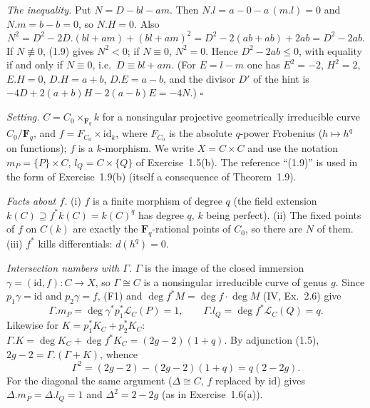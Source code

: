 \documentclass[11pt]{article}
\begin{document}
\emph{The inequality.} Put $N=D-bl-am$. Then $N.l=a-0-a\,(m.l)=0$ and $N.m=b-b=0$, so $N.H=0$. Also
\[ N^2=D^2-2D.(bl+am)+(bl+am)^2=D^2-2(ab+ab)+2ab=D^2-2ab. \]
If $N\not\equiv0$, (1.9) gives $N^2<0$; if $N\equiv0$, $N^2=0$. Hence $D^2-2ab\le0$, with equality if and only if $N\equiv0$, i.e.\ $D\equiv bl+am$. (For $E=l-m$ one has $E^2=-2$, $H^2=2$, $E.H=0$, $D.H=a+b$, $D.E=a-b$, and the divisor $D'$ of the hint is $-4D+2(a+b)H-2(a-b)E=-4N$.) \hfill$\square$

\pf
\emph{Setting.} $C=C_0\times_{\mathbf F_q}k$ for a nonsingular projective geometrically irreducible curve $C_0/\mathbf F_q$, and $f=F_{C_0}\times\mathrm{id}_k$, where $F_{C_0}$ is the absolute $q$-power Frobenius ($h\mapsto h^q$ on functions); $f$ is a $k$-morphism. We write $X=C\times C$ and use the notation $m_P=\{P\}\times C$, $l_Q=C\times\{Q\}$ of Exercise~1.5(b). The reference ``(1.9)'' is used in the form of Exercise~1.9(b) (itself a consequence of Theorem~1.9).

\emph{Facts about $f$.} (i) $f$ is a finite morphism of degree $q$ (the field extension $k(C)\supseteq f^*k(C)=k(C)^q$ has degree $q$, $k$ being perfect). (ii) The fixed points of $f$ on $C(k)$ are exactly the $\mathbf F_q$-rational points of $C_0$, so there are $N$ of them. (iii) $f^*$ kills differentials: $d(h^q)=0$.

\emph{Intersection numbers with $\Gamma$.} $\Gamma$ is the image of the closed immersion $\gamma=(\mathrm{id},f):C\to X$, so $\Gamma\cong C$ is a nonsingular irreducible curve of genus $g$. Since $p_1\gamma=\mathrm{id}$ and $p_2\gamma=f$, (F1) and $\deg f^*M=\deg f\cdot\deg M$ (IV, Ex.~2.6) give
\[ \Gamma.m_P=\deg\gamma^*p_1^*\mathcal L_C(P)=1,\qquad \Gamma.l_Q=\deg f^*\mathcal L_C(Q)=q. \]
Likewise for $K=p_1^*K_C+p_2^*K_C$: $\Gamma.K=\deg K_C+\deg f^*K_C=(2g-2)(1+q)$. By adjunction (1.5), $2g-2=\Gamma.(\Gamma+K)$, whence
\[ \Gamma^2=(2g-2)-(2g-2)(1+q)=q(2-2g). \]
For the diagonal the same argument ($\Delta\cong C$, $f$ replaced by $\mathrm{id}$) gives $\Delta.m_P=\Delta.l_Q=1$ and $\Delta^2=2-2g$ (as in Exercise~1.6(a)).
\end{document}
